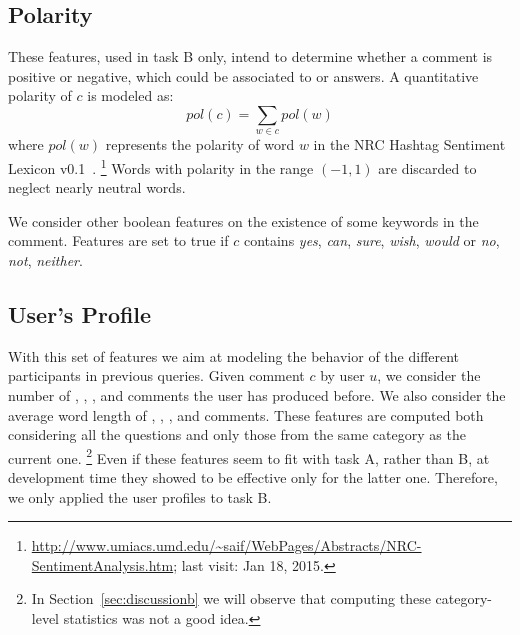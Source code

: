 
\subsection{Polarity}
\label{sub:polarity}

These features, used in task B only, intend to determine whether a comment is 
positive or negative, which could be associated to \yes or \no answers. A 
quantitative polarity of $c$ is modeled as:
\begin{equation}
pol(c) = \sum_{w\in c} pol(w) 
\end{equation}
%
where $pol(w)$ represents the polarity of word $w$ in the NRC Hashtag Sentiment 
Lexicon v0.1~\cite{MohammadKZ2013}.%
\footnote{\url{
http://www.umiacs.umd.edu/~saif/WebPages/Abstracts/NRC-SentimentAnalysis.htm}; 
last visit: Jan 18, 2015.}
Words with polarity in the range $(-1,1)$ are discarded to neglect nearly 
neutral words.

We consider other boolean features on the existence of some keywords in the 
comment. Features are set to true if $c$ contains
\Ni \textit{yes}, \textit{can}, \textit{sure}, \textit{wish}, \textit{would} or
\Nii \textit{no}, \textit{not}, \textit{neither}.


\subsection{User's Profile}
\label{sub:profile}

With this set of features we aim at modeling the behavior of the different 
participants in previous queries. Given comment $c$ by user $u$, we consider 
the number of \good, \bad, \pot, and \dial comments the user has produced 
before. We also consider the average word length of \good, \bad, \pot, and \dial 
comments. These features are computed both considering all the questions and 
only those from the same category as the current one.%
\footnote{In Section~\ref{sec:discussionb} we will observe that computing these 
category-level statistics was not a good idea.}
Even if these features seem to fit with task A, rather than B, at development 
time they showed to be effective only for the latter one. Therefore, we only 
applied the user profiles to task B. 


